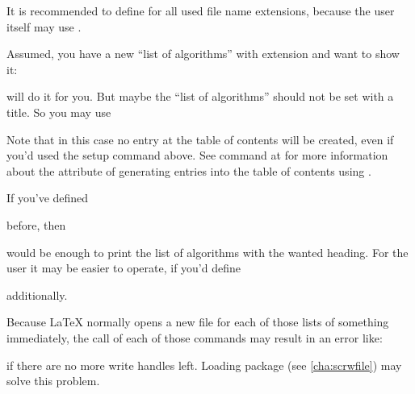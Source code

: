 It is recommended to define
 for all used file name extensions, because
the user itself may use .
\begin{Example}
  Assumed, you have a new ``list of algorithms'' with extension 
  and want to show it:
\begin{lstcode}
\end{lstcode}
  will do it for you. But maybe the ``list of algorithms'' should not be set
  with a title. So you may use
\begin{lstcode}
\end{lstcode}
  Note that in this case no entry at the table of contents will be created,
  even if you'd used the setup command above.
  See command 
  at 
  for more information about the
  attribute of generating entries into the table of contents using
  .

  If you've defined
\begin{lstcode}
  \newcommand*{\listofloaname}{%
    List of Algorithms%
  }
\end{lstcode}
  before, then
\begin{lstcode}
\end{lstcode}
  would be enough to print the list of algorithms with the wanted heading. For
  the user it may be easier to operate, if you'd define
\begin{lstcode}
  \newcommand*{\listofalgorithms}{\listoftoc{loa}}
\end{lstcode}
  additionally.
\end{Example}

Because \LaTeX{} normally opens a new file for each of
those lists of something immediately, the call of each of those commands may
result in an error like:
if there are no more write handles left. Loading package
(see \autoref{cha:scrwfile})
may solve this problem.
%
%
%
%

